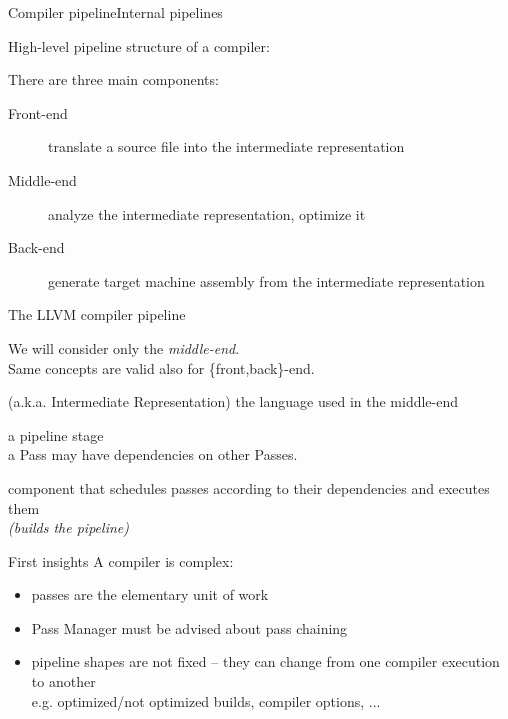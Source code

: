 \documentclass[10pt,mathserif]{beamer}
\begin{document}
\begin{frame}{Compiler pipeline}{Internal pipelines}
\begin{center}
High-level pipeline structure of a compiler:\\
\begin{figure}
\centering

\end{figure}
\medskip
There are three main components:

\begin{description}
\item[Front-end] \alert{translate} a source file into the intermediate representation
\item[Middle-end] \alert{analyze} the intermediate representation, \alert{optimize}
                  it
\item[Back-end] \alert{generate} target machine assembly from the intermediate
                representation
\end{description}
\end{center}
\end{frame}


\begin{frame}{The LLVM compiler pipeline}
\begin{center}
We will consider only the \emph{middle-end}.\\
{\small Same concepts are valid also for \{front,back\}-end.}\\
\bigskip
\begin{description}
\item[IR] (a.k.a. Intermediate Representation) the \alert{language} used in the
          middle-end
\item[Pass] a \alert{pipeline stage}\\
a Pass may have \alert{dependencies} on other Passes.
\item[Pass Manager] component that \alert{schedules} passes according to their \alert{dependencies} and \alert{executes} them\\
\emph{(builds the pipeline)}
\end{description}
\end{center}
\end{frame}


\begin{frame}{First insights}
A compiler is \alert{complex}:

\begin{itemize}
\item passes are the \alert{elementary unit of work}
\item Pass Manager must be \alert{advised} about pass chaining
\item pipeline shapes are \alert{not fixed} -- they can change from one compiler
      execution to another\\
      {\small e.g. optimized/not optimized builds, compiler options, ...}
\end{itemize}
\end{frame}
\end{document}
